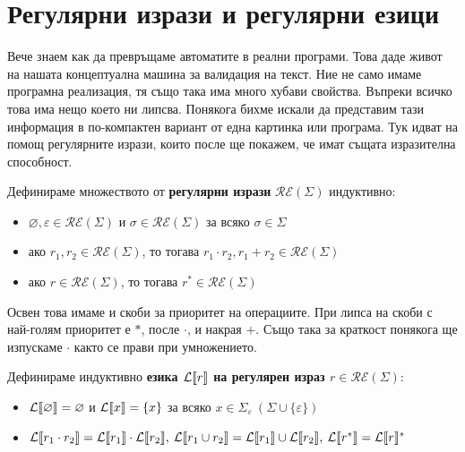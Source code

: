 \section{Регулярни изрази и регулярни езици}

Вече знаем как да превръщаме автоматите в реални програми.
Това даде живот на нашата концептуална машина за валидация на текст.
Ние не само имаме програмна реализация, тя също така има много хубави свойства.
Въпреки всичко това има нещо което ни липсва.
Понякога бихме искали да представим тази информация в по-компактен вариант от една картинка или програма.
Тук идват на помощ регулярните изрази, които после ще покажем, че имат същата изразителна способност.

\begin{definition}
    Дефинираме множеството от \textbf{регулярни изрази} $\mathcal{RE}(\Sigma)$ индуктивно:
    \begin{itemize}
        \item $\varnothing, \varepsilon \in \mathcal{RE}(\Sigma)$ и $\sigma \in \mathcal{RE}(\Sigma)$ за всяко $\sigma \in \Sigma$
        \item ако $r_1, r_2 \in \mathcal{RE}(\Sigma)$, то тогава $r_1 \cdot r_2, r_1 + r_2 \in \mathcal{RE}(\Sigma)$
        \item ако $r \in \mathcal{RE}(\Sigma)$, то тогава $r^* \in \mathcal{RE}(\Sigma)$
    \end{itemize}
\end{definition}

\begin{remark}
    Освен това имаме и скоби за приоритет на операциите.
    При липса на скоби с най-голям приоритет е $*$, после $\cdot$, и накрая $+$.
    Също така за краткост понякога ще изпускаме $\cdot$ както се прави при умножението.
\end{remark}

\begin{definition}
    Дефинираме индуктивно \textbf{езика $\mathcal{L}\llbracket r \rrbracket$ на регулярен израз $r \in \mathcal{RE}(\Sigma)$}:
    \begin{itemize}
        \item $\mathcal{L}\llbracket \varnothing \rrbracket = \varnothing$ и $\mathcal{L}\llbracket x \rrbracket = \{ x \}$ за всяко $x \in \Sigma_{\varepsilon} \: (\Sigma \cup \{ \varepsilon \})$
        \item $\mathcal{L}\llbracket r_1 \cdot r_2 \rrbracket = \mathcal{L}\llbracket r_1 \rrbracket \cdot \mathcal{L}\llbracket r_2 \rrbracket, \: \mathcal{L}\llbracket r_1 \cup r_2 \rrbracket = \mathcal{L}\llbracket r_1 \rrbracket \cup \mathcal{L}\llbracket r_2 \rrbracket, \: \mathcal{L}\llbracket r^* \rrbracket = \mathcal{L}\llbracket r \rrbracket^*$
    \end{itemize}
\end{definition}

